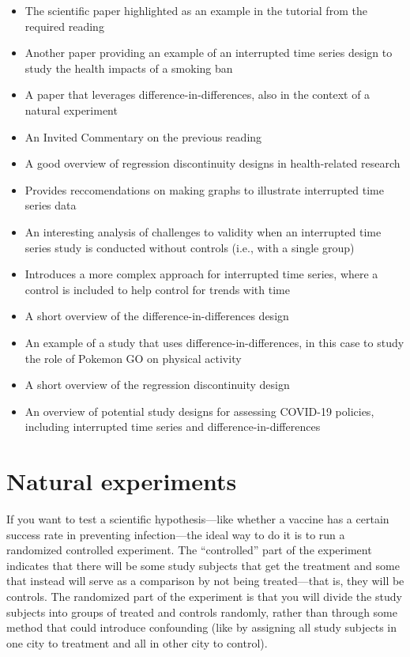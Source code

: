\documentclass[
]{book}
\providecommand{\tightlist}{%
  \setlength{\itemsep}{0pt}\setlength{\parskip}{0pt}}
\begin{document}
\begin{itemize}
\tightlist
\item
  \citet{barone2011effects} The scientific paper highlighted as an example in the tutorial from the required reading
\item
  \citet{sargent2004reduced} Another paper providing an example of an interrupted time series design to study the health impacts of a smoking ban
\item
  \citet{casey2018retirements} A paper that leverages difference-in-differences, also in the context of a natural experiment
\item
  \citet{mendola2018invited} An Invited Commentary on the previous reading
\item
  \citet{venkataramani2016regression} A good overview of regression discontinuity designs in health-related research
\item
  \citet{turner2021creating} Provides reccomendations on making graphs to illustrate interrupted time series data
\item
  \citet{linden2017challenges} An interesting analysis of challenges to validity when an interrupted time series study is conducted without controls (i.e., with a single group)
\item
  \citet{bottomley2019analysing} Introduces a more complex approach for interrupted time series, where a control is included to help control for trends with time
\item
  \citet{dimick2014methods} A short overview of the difference-in-differences design
\item
  \citet{howe2016gotta} An example of a study that uses difference-in-differences, in this case to study the role of Pokemon GO on physical activity
\item
  \citet{maciejewski2020regression} A short overview of the regression discontinuity design
\item
  \citet{haber2021covid} An overview of potential study designs for assessing COVID-19 policies, including interrupted time series and difference-in-differences
\end{itemize}

\section{Natural experiments}\label{natural-experiments-1}

If you want to test a scientific hypothesis---like whether a vaccine has a certain success rate in preventing infection---the ideal way to do it is to run a randomized controlled experiment. The ``controlled'' part of the experiment indicates that there will be some study subjects that get the treatment and some that instead will serve as a comparison by not being treated---that is, they will be controls. The randomized part of the experiment is that you will divide the study subjects into groups of treated and controls randomly, rather than through some method that could introduce confounding (like by assigning all study subjects in one city to treatment and all in other city to control).
\end{document}
